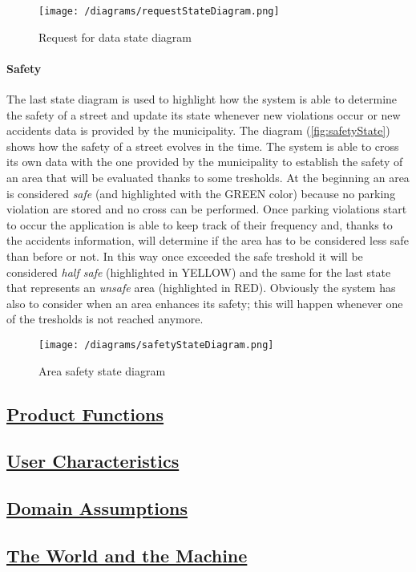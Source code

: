 		\vspace{0.3cm}
		\begin{figure}[h]
			\centering
			\texttt{[image: /diagrams/requestStateDiagram.png]}
			\caption{\label{fig:requestState}Request for data state diagram}
		\end{figure}
	
	\paragraph{Safety}
		The last state diagram is used to highlight how the system is able to determine the safety of a street and update its state whenever new violations occur or new accidents data is provided by the municipality. 
		The diagram (\autoref{fig:safetyState}) shows how the safety of a street evolves in the time. The system is able to cross its own data with the one provided by the municipality to establish the safety of an area that will be evaluated thanks to some tresholds. At the beginning an area is considered \textit{safe} (and highlighted with the GREEN color) because no parking violation are stored and no cross can be performed. Once parking violations start to occur the application is able to keep track of their frequency and, thanks to the accidents information, will determine if the area has to be considered less safe than before or not. In this way once exceeded the safe treshold it will be considered \textit{half safe} (highlighted in YELLOW) and the same for the last state that represents an \textit{unsafe} area (highlighted in RED). Obviously the system has also to consider when an area enhances its safety; this will happen whenever one of the tresholds is not reached anymore. 
		
		\vspace{0.3cm}
		\begin{figure}[h]
			\centering
			\texttt{[image: /diagrams/safetyStateDiagram.png]}
			\caption{\label{fig:safetyState}Area safety state diagram}
		\end{figure}   

\subsection[Product Functions]{\hyperlink{toc}{Product Functions}}

\subsection[User Characteristics]{\hyperlink{toc}{User Characteristics}}

\subsection[Domain Assumptions]{\hyperlink{toc}{Domain Assumptions}}

\subsection[The World and the Machine]{\hyperlink{toc}{The World and the Machine}}
